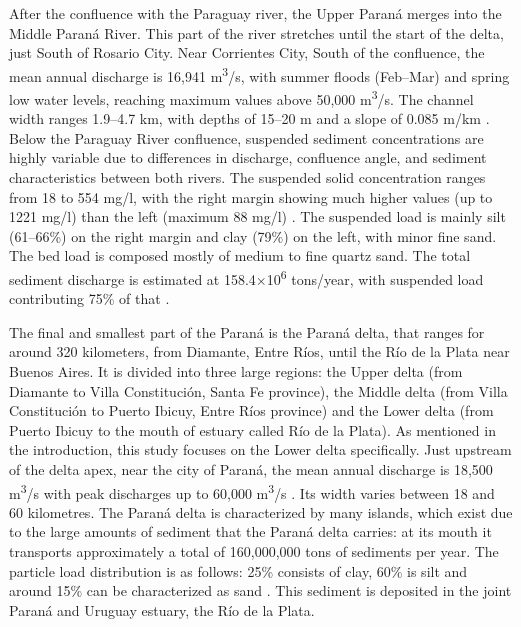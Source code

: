 After the confluence with the Paraguay river, the Upper Paraná merges into the Middle Paraná River. This part of the river stretches until the start of the delta, just South of Rosario City. Near Corrientes City, South of the confluence, the mean annual discharge is 16,941 m\textsuperscript{3}/s, with summer floods (Feb–Mar) and spring low water levels, reaching maximum values above 50,000 m\textsuperscript{3}/s. The channel width ranges 1.9–4.7 km, with depths of 15–20 m and a slope of 0.085 m/km \autocite{orfeoHydraulicMorphologicalCharacteristics2002}. Below the Paraguay River confluence, suspended sediment concentrations are highly variable due to differences in discharge, confluence angle, and sediment characteristics between both rivers. The suspended solid concentration ranges from 18 to 554 mg/l, with the right margin showing much higher values (up to 1221 mg/l) than the left (maximum 88 mg/l)  \autocite{depetrisSuspendedLoadRio1968}. The suspended load is mainly silt (61–66\%) on the right margin and clay (79\%) on the left, with minor fine sand. The bed load is composed mostly of medium to fine quartz sand. The total sediment discharge is estimated at 158.4×10\textsuperscript{6} tons/year, with suspended load contributing 75\% of that \autocite{orfeoHydraulicMorphologicalCharacteristics2002}.

The final and smallest part of the Paraná is the Paraná delta, that ranges for around 320 kilometers, from Diamante, Entre Ríos, until the Río de la Plata near Buenos Aires. It is divided into three large regions: the Upper delta (from Diamante to Villa Constitución, Santa Fe province), the Middle delta (from Villa Constitución to Puerto Ibicuy, Entre Ríos province) and the Lower delta (from Puerto Ibicuy to the mouth of estuary called Río de la Plata). As mentioned in the introduction, this study focuses on the Lower delta specifically. Just upstream of the delta apex, near the city of Paraná, the mean annual discharge is 18,500 m\textsuperscript{3}/s with peak discharges up to 60,000 m\textsuperscript{3}/s \autocite{westerHydrodynamicModellingTidal2018}. Its width varies between 18 and 60 kilometres. The Paraná delta is characterized by many islands, which exist due to the large amounts of sediment that the Paraná delta carries: at its mouth it transports approximately a total of 160,000,000 tons of sediments per year. The particle load distribution is as follows: 25\% consists of clay, 60\% is silt and around 15\% can be characterized as sand \autocite{academialabParanaDelta}. This sediment is deposited in the joint Paraná and Uruguay estuary, the Río de la Plata.

